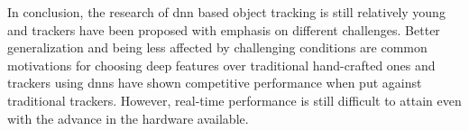 In conclusion, the research of \ac{dnn} based object tracking is still relatively
young and trackers have been proposed with emphasis on different challenges. Better
generalization and being less affected by challenging conditions are common motivations
for choosing deep features over traditional hand-crafted ones and trackers using
\ac{dnn}s have shown competitive performance when put against traditional trackers.
However, real-time performance is still difficult to attain even with the advance
in the hardware available.
